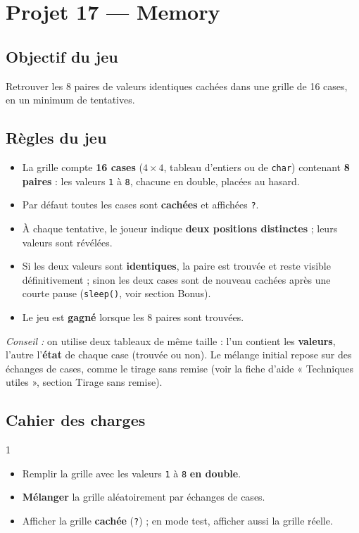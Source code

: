 \section{Projet 17 — Memory}
\setcounter{UPSTInumeroCahier des charges}{0}

\subsection*{Objectif du jeu}
Retrouver les 8 paires de valeurs identiques cachées dans une grille de 16 cases, en un minimum de tentatives.

\subsection*{Règles du jeu}
\begin{itemize}
  \item La grille compte \textbf{16 cases} ($4\times4$, tableau d'entiers ou de \texttt{char}) contenant \textbf{8 paires} : les valeurs \texttt{1} à \texttt{8}, chacune en double, placées au hasard.
  \item Par défaut toutes les cases sont \textbf{cachées} et affichées \texttt{?}.
  \item À chaque tentative, le joueur indique \textbf{deux positions distinctes} ; leurs valeurs sont révélées.
  \item Si les deux valeurs sont \textbf{identiques}, la paire est trouvée et reste visible définitivement ; sinon les deux cases sont de nouveau cachées après une courte pause (\texttt{sleep()}, voir section Bonus).
  \item Le jeu est \textbf{gagné} lorsque les 8 paires sont trouvées.
\end{itemize}

\textit{Conseil :} on utilise deux tableaux de même taille : l'un contient les \textbf{valeurs}, l'autre l'\textbf{état} de chaque case (trouvée ou non). Le mélange initial repose sur des échanges de cases, comme le tirage sans remise (voir la fiche d'aide « Techniques utiles », section Tirage sans remise).

\subsection*{Cahier des charges}
\begin{UPSTICahierDesCharges}{1}
\begin{itemize}
  \item Remplir la grille avec les valeurs \texttt{1} à \texttt{8} \textbf{en double}.
  \item \textbf{Mélanger} la grille aléatoirement par échanges de cases.
  \item Afficher la grille \textbf{cachée} (\texttt{?}) ; en mode test, afficher aussi la grille réelle.
\end{itemize}
\end{UPSTICahierDesCharges}

